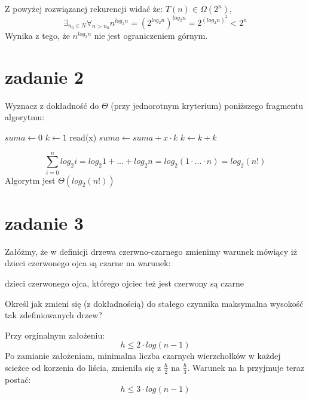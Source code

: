 \documentclass[svgnames]{report}
\begin{document}
Z powyżej rozwiązanej rekurencji widać że: $T(n) \in \Omega (2^n)$, 
\begin{equation}
	\exists_{n_0 \in N} \forall_{n > n_0} n^{log_2 n} = \left(2^{log_2 n}\right)^{log_2 n} = 2^{(log_2 n)^2} < 2^n
\end{equation}
Wynika z tego, że $n^{log_2 n}$ nie jest ograniczeniem górnym.


\section{zadanie 2}
\begin{framed}
Wyznacz z dokładność do $\Theta$ (przy jednorotnym kryterium) poniższego fragmentu algorytmu:
\begin{algorithmic}
\STATE $suma \leftarrow 0$
	\STATE $k \leftarrow 1$
		\STATE read(x)
		\STATE $suma \leftarrow suma + x \cdot k$
		\STATE $k \leftarrow k + k$
	\ENDWHILE
\ENDFOR
\end{algorithmic}
\end{framed}

\begin{equation*}
	\sum\limits_{i=0}^{n} log_2 i = log_2 1 + ... + log_2 n = log_2(1 \cdot ... \cdot n) = log_2(n!)
\end{equation*}
Algorytm jest $\Theta(log_2(n!))$


\section{zadanie 3}
\begin{framed}
Załóżmy, że w definicji drzewa czerwno-czarnego zmienimy warunek mówiący iż dzieci czerwonego ojca są czarne na warunek:

dzieci czerwonego ojca, którego ojciec też jest czerwony są czarne

Określ jak zmieni się (z dokładnością) do stałego czynnika maksymalna wysokość tak zdefiniowanych drzew?

\end{framed}

Przy orginalnym założeniu:
\begin{equation*}
h \leqslant 2 \cdot log(n-1)
\end{equation*}
Po zamianie założeniam, minimalna liczba czarnych wierzchołków w każdej scieżce od korzenia do liścia, zmieniła się z $\frac{h}{2}$ na $\frac{h}{3}$. Warunek na h przyjmuje teraz postać:
\begin{equation*}
h \leqslant 3 \cdot log(n-1)
\end{equation*}
\end{document}
